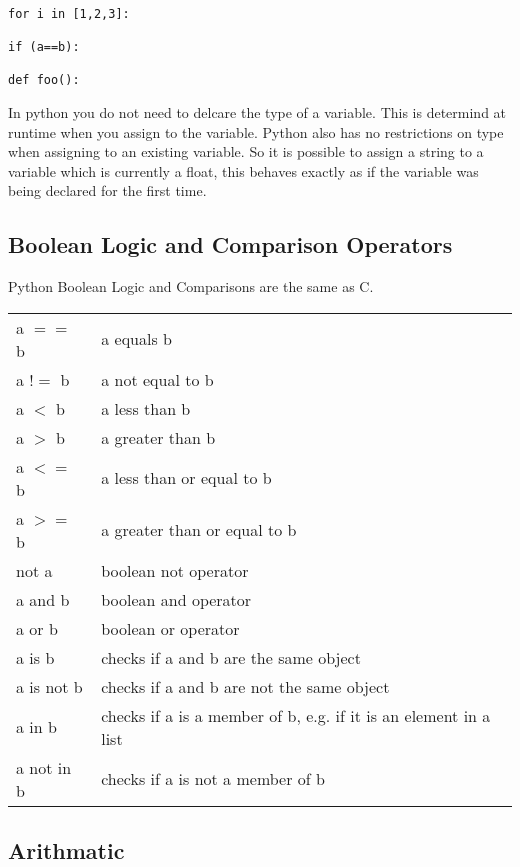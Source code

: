\documentclass[11pt,a4paper]{article}
\begin{document}
\begin{verbatim}

for i in [1,2,3]:

if (a==b):

def foo():

\end{verbatim}

In python you do not need to delcare the type of a variable. This is determind at runtime when you assign to the variable. Python also has no restrictions on type when assigning to an existing variable. So it is possible to assign a string to a variable which is currently a float, this behaves exactly as if the variable was being declared for the first time.

\subsection{Boolean Logic and Comparison Operators}

Python Boolean Logic and Comparisons are the same as C.

\begin{center}
\begin{tabular}{l l}
a $==$ b & a equals b \\ 
a $!=$ b & a not equal to b \\
a $<$ b & a less than b \\
a $>$ b & a greater than b \\
a $<=$ b & a less than or equal to b\\
a $>=$ b & a greater than or equal to b\\
not a & boolean not operator \\
a and b & boolean and operator \\
a or b & boolean or operator \\
a is b & checks if a and b are the same object \\
a is not b & checks if a and b are not the same object \\
a in b & checks if a is a member of b, e.g. if it is an element in
a list \\
a not in b & checks if a is not a member of b\\
\end{tabular}
\end{center}


\subsection{Arithmatic}
\end{document}
